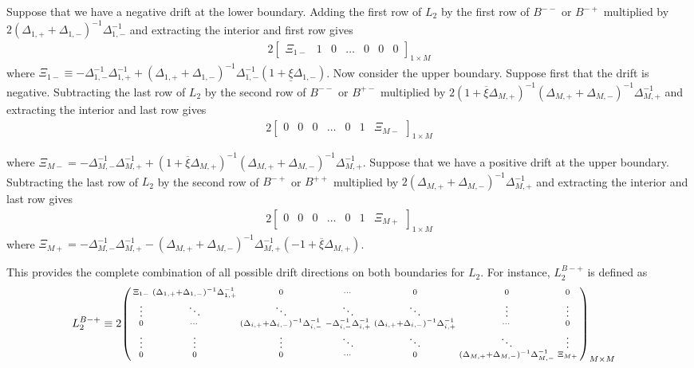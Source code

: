 \documentclass[11pt]{article}
\newenvironment{psmallmatrix}
{\left(\begin{smallmatrix}}
	{\end{smallmatrix}\right)}
\theoremstyle{definition}
\begin{document}
Suppose that we have a negative drift at the lower boundary. Adding the first row of $L_2$ by the first row of $B^{--}$ or $B^{-+}$ multiplied by $2(\Delta_{1,+} + \Delta_{1,-} )^{-1} \Delta_{1,-}^{-1}$ and extracting the interior and first row gives
\begin{align}
2\begin{bmatrix}
\Xi_{1-} &1&0&\dots&0&0&0
\end{bmatrix}_{1\times M}
\end{align}
where $\Xi_{1-} \equiv -\Delta_{1,-}^{-1} \Delta_{1,+}^{-1}  + (\Delta_{1,+} + \Delta_{1,-} )^{-1} \Delta_{1,-}^{-1} (1 + \underline{\xi}\Delta_{1,-})$.
Now consider the upper boundary. Suppose first that the drift is negative. Subtracting the last row of $L_2$ by the second row of $B^{--}$ or $B^{+-}$ multiplied by $2(1 + \overline{\xi} \Delta_{M,+} )^{-1} (\Delta_{M,+} + \Delta_{M,-})^{-1}  \Delta_{M,+}^{-1}$ and extracting the interior and last row gives 
\begin{align}
2\begin{bmatrix}
0 &0&0&\dots&0&1&\Xi_{M-}
\end{bmatrix}_{1\times M}
\end{align}

where $\Xi_{M-} = -\Delta_{M,-}^{-1} \Delta_{M,+}^{-1} + (1 + \overline{\xi} \Delta_{M,+})^{-1} (\Delta_{M,+} + \Delta_{M,-})^{-1}  \Delta_{M,+}^{-1}$. Suppose that we have a positive drift at the upper boundary. Subtracting the last row of $L_2$ by the second row of $B^{-+}$ or $B^{++}$ multiplied by $2(\Delta_{M,+} + \Delta_{M,-})^{-1} \Delta_{M,+}^{-1} $ and extracting the interior and last row gives
\begin{align}
2\begin{bmatrix}
0 &0&0&\dots&0&1&\Xi_{M+}
\end{bmatrix}_{1\times M}
\end{align}
where $\Xi_{M+} = -\Delta_{M,-}^{-1} \Delta_{M,+}^{-1} - ( \Delta_{M,+} + \Delta_{M,-} )^{-1} \Delta_{M,+}^{-1} (-1 + \overline{\xi} \Delta_{M,+})  $.

This provides the complete combination of all possible drift directions on both boundaries for $L_2$. For instance, $L_2^{B-+}$ is defined as
\begin{align}
L_2^{B-+} &\equiv  2 \begin{psmallmatrix}
\Xi_{1-} &
(\Delta_{1,+}+\Delta_{1,-})^{-1} \Delta_{1,+}^{-1}
&0&\cdots&0&0&0 \\
\vdots&\ddots&\ddots&\ddots&\ddots&\vdots&\vdots\\
0&\cdots&
(\Delta_{i,+}+\Delta_{i,-})^{-1} \Delta_{i,-}^{-1} &
-\Delta_{i,-}^{-1} \Delta_{i,+}^{-1}  &
(\Delta_{i,+}+\Delta_{i,-})^{-1} \Delta_{i,+}^{-1}&\cdots&0 \\
\vdots&\vdots&\vdots&\ddots&\ddots&\ddots&\vdots\\
0&0&0&\cdots&0&(\Delta_{M,+}+\Delta_{M,-})^{-1} \Delta_{M,-}^{-1}&\Xi_{M+}
\end{psmallmatrix}_{M\times M}
\end{align}
\end{document}
